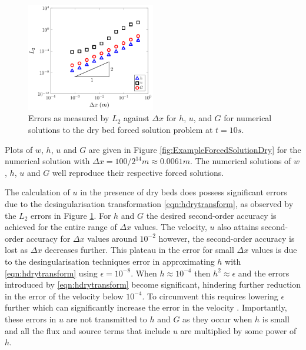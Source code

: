 \documentclass[times]{elsarticle}
\begin{document}
\begin{figure}
	\centering
		\includegraphics[width=0.5\textwidth]{./Figures/Forced/Dry1/L2.pdf}
	\caption{Errors as measured by $L_2$ against $\Delta x$ for $h$, $u$, and $G$ for numerical solutions to the dry bed forced solution problem at $t=10s$.}
	\label{fig:L1convergenceforcedWet}
\end{figure}

 
Plots of $w$, $h$, $u$ and $G$ are given in Figure \ref{fig:ExampleForcedSolutionDry} for the numerical solution with $\Delta x = 100 / 2^{14}m\approx 0.0061m$. The numerical solutions of $w$, $h$, $u$ and $G$ well reproduce their respective forced solutions.

The calculation of $u$ in the presence of dry beds does possess significant errors due to the desingularisation transformation \eqref{eqn:hdrytransform}, as observed by the $L_2$ errors in Figure \ref{fig:L1convergenceforcedWet}. For $h$ and $G$ the desired second-order accuracy is achieved for the entire range of $\Delta x$ values. The velocity, $u$ also attains second-order accuracy for $\Delta x$ values around $10^{-2}$ however, the second-order accuracy is lost as $\Delta x$ decreases further. This plateau in the error for small $\Delta x$ values is due to the desingularisation techniques error in approximating $h$ with \eqref{eqn:hdrytransform} using $\epsilon = 10^{-8}$. When $h \approx 10^{-4}$ then $h^2 \approx \epsilon$ and the errors introduced by \eqref{eqn:hdrytransform} become significant, hindering further reduction in the error of the velocity below $10^{-4}$. To circumvent this requires lowering $\epsilon$ further which can significantly increase the error in the velocity \cite{Kurganov-Petrova-2007-707}. Importantly, these errors in $u$ are not transmitted to $h$ and $G$ as they occur when $h$ is small and all the flux and source terms that include $u$ are multiplied by some power of $h$.
\end{document}
